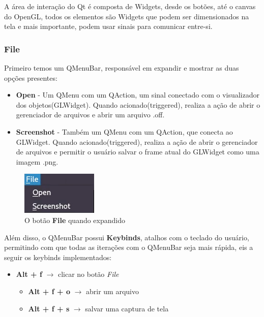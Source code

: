\documentclass{ol-softwaremanual}
\begin{document}
A área de interação do Qt é composta de Widgets, desde os botões, até o canvas 
do OpenGL, todos os elementos são Widgets que podem ser dimensionados na tela e 
mais importante, podem usar sinais para comunicar entre-si.

\subsubsection{File}

Primeiro temos um QMenuBar, responsável em expandir e mostrar as duas
opções presentes:

\begin{itemize}
    \item \textbf{Open} - Um QMenu com um QAction, um sinal conectado
    com o visualizador dos objetos(GLWidget). Quando acionado(triggered), realiza
    a ação de abrir o gerenciador de arquivos e abrir um arquivo .off.
    \item \textbf{Screenshot} - Também um QMenu com um QAction, que conecta 
    ao GLWidget. Quando acionado(triggered), realiza a ação de abrir o gerenciador de arquivos
    e permitir o usuário salvar o frame atual do GLWidget como uma imagem .png.
\end{itemize}

\begin{figure}[H]
    \centering
    \includegraphics[width=.2\textwidth]{File.jpg}
    \caption{O botão \textbf{File} quando expandido}
\end{figure}

Além disso, o QMenuBar possui \textbf{Keybinds}, atalhos com o teclado do usuário, 
permitindo com que todas as iterações com o QMenuBar seja mais rápida, eis a seguir 
os keybinds implementados:

\begin{itemize}
    \item \textbf{Alt + f} $\rightarrow$ clicar no botão \emph{File}
    \begin{itemize}
        \item \textbf{Alt + f + o} $\rightarrow$ abrir um arquivo 
        \item \textbf{Alt + f + s} $\rightarrow$ salvar uma captura de tela 
    \end{itemize}
\end{itemize}
\end{document}
